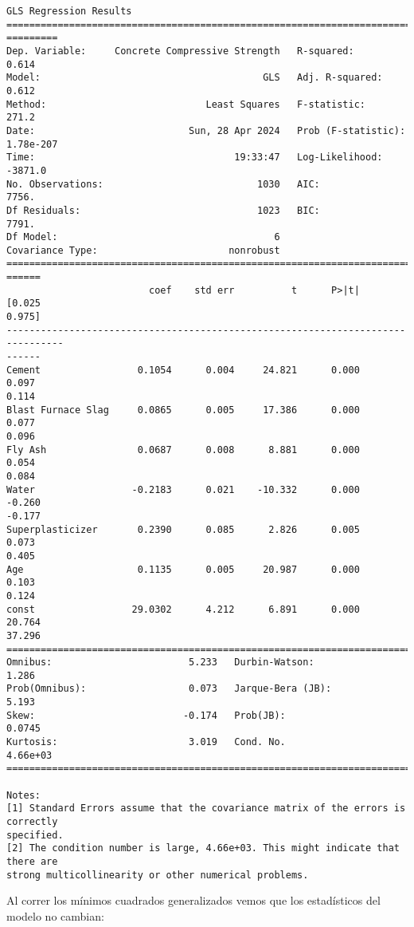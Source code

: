 \documentclass[11pt]{article}
\begin{document}
    \begin{Verbatim}[commandchars=\\\{\}]
                                  GLS Regression Results
================================================================================
=========
Dep. Variable:     Concrete Compressive Strength   R-squared:
0.614
Model:                                       GLS   Adj. R-squared:
0.612
Method:                            Least Squares   F-statistic:
271.2
Date:                           Sun, 28 Apr 2024   Prob (F-statistic):
1.78e-207
Time:                                   19:33:47   Log-Likelihood:
-3871.0
No. Observations:                           1030   AIC:
7756.
Df Residuals:                               1023   BIC:
7791.
Df Model:                                      6
Covariance Type:                       nonrobust
================================================================================
======
                         coef    std err          t      P>|t|      [0.025
0.975]
--------------------------------------------------------------------------------
------
Cement                 0.1054      0.004     24.821      0.000       0.097
0.114
Blast Furnace Slag     0.0865      0.005     17.386      0.000       0.077
0.096
Fly Ash                0.0687      0.008      8.881      0.000       0.054
0.084
Water                 -0.2183      0.021    -10.332      0.000      -0.260
-0.177
Superplasticizer       0.2390      0.085      2.826      0.005       0.073
0.405
Age                    0.1135      0.005     20.987      0.000       0.103
0.124
const                 29.0302      4.212      6.891      0.000      20.764
37.296
==============================================================================
Omnibus:                        5.233   Durbin-Watson:                   1.286
Prob(Omnibus):                  0.073   Jarque-Bera (JB):                5.193
Skew:                          -0.174   Prob(JB):                       0.0745
Kurtosis:                       3.019   Cond. No.                     4.66e+03
==============================================================================

Notes:
[1] Standard Errors assume that the covariance matrix of the errors is correctly
specified.
[2] The condition number is large, 4.66e+03. This might indicate that there are
strong multicollinearity or other numerical problems.
    \end{Verbatim}

    Al correr los mínimos cuadrados generalizados vemos que los estadísticos
del modelo no cambian:
\end{document}
